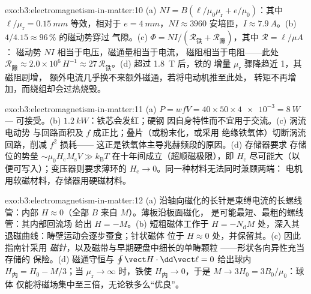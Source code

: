 \begin{solution}{exo:b3:electromagnetism-in-matter:10}
(a) $NI = B(\ell/\mu_0\mu_{\text{r}} + e/\mu_0)$：其中
$\ell/\mu_{\text{r}} = \qty{0.15}{mm}$ 等效，相对于 $e =
\qty{4}{mm}$，$NI \approx 3960$ 安培匝，$I \approx
\qty{7.9}{A}$。(b) $4/4.15 \approx 96\,\%$ 的磁动势穿过
气隙。(c) $\Phi = NI/(\mathcal R_{\text{铁}} +
\mathcal R_{\text{隙}})$，其中 $\mathcal R = \ell/\mu A$：
磁动势 $NI$ 相当于电压，磁通量相当于电流，
磁阻相当于电阻——此处 $\mathcal R_{\text{隙}}
\approx 2.0\times10^{6}\,\unit{H^{-1}} \approx
27\,\mathcal R_{\text{铁}}$。(d) 超过 \qty{1.8}{T} 后，铁的
增量 $\mu_{\text{r}}$ 骤降趋近 1，其磁阻剧增，
额外电流几乎换不来额外磁通，若将电动机推至此处，
转矩不再增加，而绕组却会过热烧毁。
\end{solution}

\begin{solution}{exo:b3:electromagnetism-in-matter:11}
(a) $P = wfV = 40\times50\times\num{4e-3} = \qty{8}{W}$ ---
可接受。(b) $\qty{1.2}{kW}$：铁芯会发红；硬钢
因自身特性而不宜用于交流。(c) 涡流电动势
与回路面积及 $f$ 成正比；叠片（或粉末化，或采用
绝缘铁氧体）切断涡流回路，削减 $f^2$ 损耗——
这正是铁氧体主导兆赫频段的原因。(d) 存储器要求
存储位的势垒 $\sim\mu_0H_{\text{c}}M_{\text{s}}V \gg
k_{\text{B}}T$ 在十年间成立（超顺磁极限），即
$H_{\text{c}}$ 尽可能大（以便可写入）；变压器则要求薄环的
$H_{\text{c}} \to 0$。同一种材料无法同时兼顾两端：
电机用软磁材料，存储器用硬磁材料。
\end{solution}

\begin{solution}{exo:b3:electromagnetism-in-matter:12}
(a) 沿轴向磁化的长针是束缚电流的长螺线管：内部
$H \approx 0$（全部 $B$ 来自 $M$）。薄板沿板面磁化，
是可能最短、最粗的螺线管：其内部回流场
给出 $H = -M$。(b)
短粗磁体工作于 $H = -N_{\text{d}}M$ 处，深入其
退磁曲线：畴壁运动会逐步蚕食；针状磁体
位于 $H \approx 0$ 处，并保留其。(c) 因此指南针采用
\emph{磁针}，以及磁带与早期硬盘中细长的单畴颗粒
——形状各向异性充当存储的
保险。(d) 磁通守恒与 $\oint\vect H\cdot
\dd\vect\ell = 0$ 给出球内 $H_{\text{内}} =
H_0 - M/3$；当 $\mu_{\text{r}}\to\infty$ 时，铁使
$H_{\text{内}}\to0$，于是 $M \to 3H_0 = 3B_0/\mu_0$：球体
仅能将磁场集中至三倍，无论铁多么“优良”。
\end{solution}


